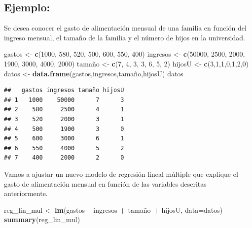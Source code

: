 \documentclass[]{book}
\newenvironment{Shaded}{\begin{snugshade}}{\end{snugshade}}
\newcommand{\KeywordTok}[1]{\textcolor[rgb]{0.13,0.29,0.53}{\textbf{#1}}}
\newcommand{\DataTypeTok}[1]{\textcolor[rgb]{0.13,0.29,0.53}{#1}}
\newcommand{\DecValTok}[1]{\textcolor[rgb]{0.00,0.00,0.81}{#1}}
\newcommand{\StringTok}[1]{\textcolor[rgb]{0.31,0.60,0.02}{#1}}
\newcommand{\OperatorTok}[1]{\textcolor[rgb]{0.81,0.36,0.00}{\textbf{#1}}}
\newcommand{\NormalTok}[1]{#1}
\begin{document}
\subsection{Ejemplo:}\label{ejemplo}

Se desea conocer el gasto de alimentación mensual de una familia en
función del ingreso mensual, el tamaño de la familia y el número de
hijos en la universidad.

\begin{Shaded}
\begin{Highlighting}[]
\NormalTok{gastos <-}\StringTok{ }\KeywordTok{c}\NormalTok{(}\DecValTok{1000}\NormalTok{, }\DecValTok{580}\NormalTok{, }\DecValTok{520}\NormalTok{, }\DecValTok{500}\NormalTok{, }\DecValTok{600}\NormalTok{, }\DecValTok{550}\NormalTok{, }\DecValTok{400}\NormalTok{)}
\NormalTok{ingresos <-}\StringTok{ }\KeywordTok{c}\NormalTok{(}\DecValTok{50000}\NormalTok{, }\DecValTok{2500}\NormalTok{, }\DecValTok{2000}\NormalTok{, }\DecValTok{1900}\NormalTok{, }\DecValTok{3000}\NormalTok{, }\DecValTok{4000}\NormalTok{, }\DecValTok{2000}\NormalTok{)}
\NormalTok{tamaño <-}\StringTok{ }\KeywordTok{c}\NormalTok{(}\DecValTok{7}\NormalTok{, }\DecValTok{4}\NormalTok{, }\DecValTok{3}\NormalTok{, }\DecValTok{3}\NormalTok{, }\DecValTok{6}\NormalTok{, }\DecValTok{5}\NormalTok{, }\DecValTok{2}\NormalTok{)}
\NormalTok{hijosU <-}\StringTok{ }\KeywordTok{c}\NormalTok{(}\DecValTok{3}\NormalTok{,}\DecValTok{1}\NormalTok{,}\DecValTok{1}\NormalTok{,}\DecValTok{0}\NormalTok{,}\DecValTok{1}\NormalTok{,}\DecValTok{2}\NormalTok{,}\DecValTok{0}\NormalTok{)}
\NormalTok{datos <-}\StringTok{ }\KeywordTok{data.frame}\NormalTok{(gastos,ingresos,tamaño,hijosU)}
\NormalTok{datos}
\end{Highlighting}
\end{Shaded}

\begin{verbatim}
##   gastos ingresos tamaño hijosU
## 1   1000    50000      7      3
## 2    580     2500      4      1
## 3    520     2000      3      1
## 4    500     1900      3      0
## 5    600     3000      6      1
## 6    550     4000      5      2
## 7    400     2000      2      0
\end{verbatim}

Vamos a ajustar un nuevo modelo de regresión lineal múltiple que
explique el gasto de alimentación mensual en función de las variables
descritas anteriormente.

\begin{Shaded}
\begin{Highlighting}[]
\NormalTok{reg_lin_mul <-}\StringTok{ }\KeywordTok{lm}\NormalTok{(gastos }\OperatorTok{~}\StringTok{ }\NormalTok{ingresos }\OperatorTok{+}\StringTok{ }\NormalTok{tamaño }\OperatorTok{+}\StringTok{ }\NormalTok{hijosU, }\DataTypeTok{data=}\NormalTok{datos)}
\KeywordTok{summary}\NormalTok{(reg_lin_mul)}
\end{Highlighting}
\end{Shaded}
\end{document}
